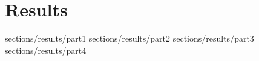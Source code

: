 \section {Results}

 {sections/results/part1} %
 {sections/results/part2} %
 {sections/results/part3} %
 {sections/results/part4} %



 
